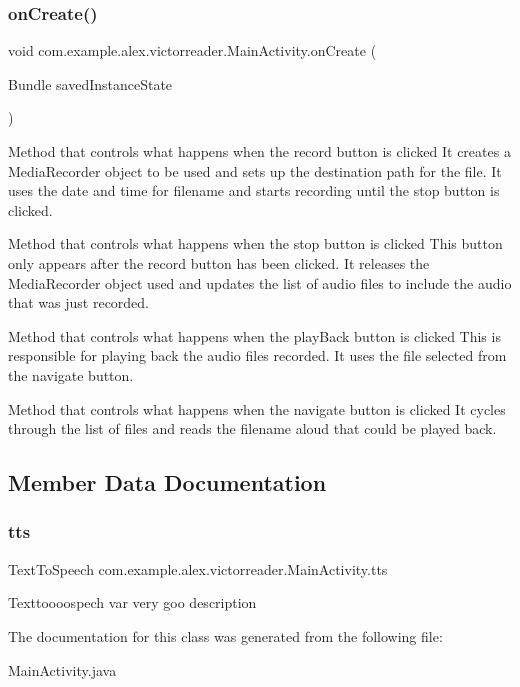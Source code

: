 \subsubsection{\texorpdfstring{on\+Create()}{onCreate()}}
{\footnotesize\ttfamily void com.\+example.\+alex.\+victorreader.\+Main\+Activity.\+on\+Create (\begin{DoxyParamCaption}\item[{Bundle}]{saved\+Instance\+State }\end{DoxyParamCaption})\hspace{0.3cm}{\ttfamily [protected]}}

Method that controls what happens when the record button is clicked It creates a Media\+Recorder object to be used and sets up the destination path for the file. It uses the date and time for filename and starts recording until the stop button is clicked.

Method that controls what happens when the stop button is clicked This button only appears after the record button has been clicked. It releases the Media\+Recorder object used and updates the list of audio files to include the audio that was just recorded.

Method that controls what happens when the play\+Back button is clicked This is responsible for playing back the audio files recorded. It uses the file selected from the navigate button.

Method that controls what happens when the navigate button is clicked It cycles through the list of files and reads the filename aloud that could be played back.

\subsection{Member Data Documentation}
\mbox{\label{classcom_1_1example_1_1alex_1_1victorreader_1_1_main_activity_a0ed6c05d6b216e7c01692c11ff660578}} 
\subsubsection{\texorpdfstring{tts}{tts}}
{\footnotesize\ttfamily Text\+To\+Speech com.\+example.\+alex.\+victorreader.\+Main\+Activity.\+tts}

Texttoooospech var very goo description 

The documentation for this class was generated from the following file\+:\begin{DoxyCompactItemize}
\item 
Main\+Activity.\+java\end{DoxyCompactItemize}
